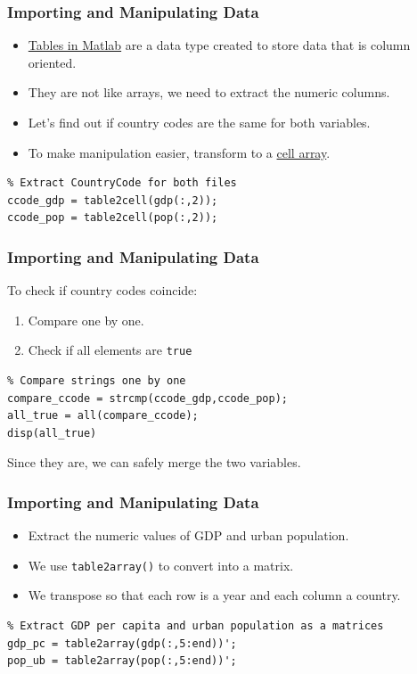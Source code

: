 \documentclass[11pt,xcolor={svgnames},aspectratio=169,usepdftitle=false,notheorems]{beamer}
\begin{document}
\begin{frame}[fragile]
  \frametitle{Importing and Manipulating Data}
\begin{itemize}
  \item \href{https://www.mathworks.com/help/matlab/tables.html}{Tables in Matlab} are a data type created to store data that is column oriented.
  \item They are not like arrays, we need to extract the numeric columns.
  \item Let's find out if country codes are the same for both variables.
  \item To make manipulation easier, transform to a \href{https://www.mathworks.com/help/matlab/ref/cell.html}{cell array}.
\end{itemize}
\begin{lstlisting}
% Extract CountryCode for both files
ccode_gdp = table2cell(gdp(:,2));
ccode_pop = table2cell(pop(:,2));
\end{lstlisting}
\end{frame}

\begin{frame}[fragile]
  \frametitle{Importing and Manipulating Data}
  To check if country codes coincide:
  \begin{enumerate}
    \item Compare one by one.
    \item Check if all elements are \verb;true;
  \end{enumerate}
\begin{lstlisting}
% Compare strings one by one
compare_ccode = strcmp(ccode_gdp,ccode_pop);
all_true = all(compare_ccode);
disp(all_true)
\end{lstlisting}
Since they are, we can safely merge the two variables.
\end{frame}

\begin{frame}[fragile]
  \frametitle{Importing and Manipulating Data}
\begin{itemize}
  \item Extract the numeric values of GDP and urban population.
  \item We use \verb;table2array(); to convert into a matrix.
  \item We transpose so that each row is a year and each column a country.
\end{itemize}
\begin{lstlisting}
% Extract GDP per capita and urban population as a matrices
gdp_pc = table2array(gdp(:,5:end))';
pop_ub = table2array(pop(:,5:end))';
\end{lstlisting}
\end{frame}
\end{document}
